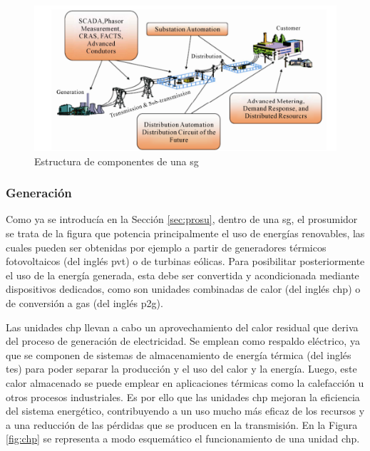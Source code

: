 \begin{figure}[h!]
  \centering
  \includegraphics[width=1\textwidth]{img/teoria/estructura_sg.png}
  \caption{Estructura de componentes de una \gls{sg} \cite{smartgrid_overview}}
  \label{fig:estructura_sg}
\end{figure}

\subsubsection{Generación}

Como ya se introducía en la Sección \ref{sec:prosu}, dentro de una \gls{sg}, el prosumidor se trata de la figura que potencia principalmente el uso de energías renovables, las cuales pueden ser obtenidas por ejemplo a partir de generadores térmicos fotovoltaicos (del inglés \gls{pvt}) o de turbinas eólicas. Para posibilitar posteriormente el uso de la energía generada, esta debe ser convertida y acondicionada mediante dispositivos dedicados, como son unidades combinadas de calor (del inglés \gls{chp}) o de conversión a gas (del inglés \gls{p2g}). \cite{transactive}

\vspace{3mm}

Las unidades \gls{chp} \cite{chp} llevan a cabo un aprovechamiento del calor residual que deriva del proceso de generación de electricidad. Se emplean como respaldo eléctrico, ya que se componen de sistemas de almacenamiento de energía térmica (del inglés \gls{tes}) para poder separar la producción y el uso del calor y la energía. Luego, este calor almacenado se puede emplear en aplicaciones térmicas como la calefacción u otros procesos industriales. Es por ello que las unidades \gls{chp} mejoran la eficiencia del sistema energético, contribuyendo a un uso mucho más eficaz de los recursos y a una reducción de las pérdidas que se producen en la transmisión. En la Figura \ref{fig:chp} se representa a modo esquemático el funcionamiento de una unidad \gls{chp}. \cite{chp2}

